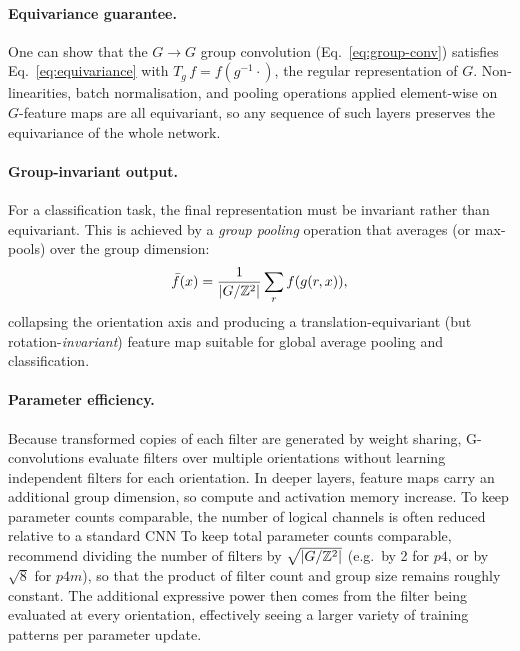 \paragraph{Equivariance guarantee.}
One can show \citep{cohen2016group} that the \(G \to G\) group convolution
(Eq.~\ref{eq:group-conv}) satisfies Eq.~\eqref{eq:equivariance} with
\(T_g\, f = f(g^{-1} \cdot)\), the regular representation of \(G\). Non-linearities, batch normalisation, and pooling
operations applied element-wise on \(G\)-feature maps are all equivariant, so any
sequence of such layers preserves the equivariance of the whole network.

\paragraph{Group-invariant output.}
For a classification task, the final representation must be invariant rather than
equivariant. This is achieved by a \emph{group pooling} operation that averages (or
max-pools) over the group dimension:
\begin{equation}
  \bar{f}(x) = \frac{1}{|G / \mathbb{Z}^2|} \sum_{r} f(g(r, x)),
  \label{eq:group-pool}
\end{equation}
collapsing the orientation axis and producing a translation-equivariant (but
rotation-\emph{invariant}) feature map suitable for global average pooling and
classification.

\paragraph{Parameter efficiency.}
Because transformed copies of each filter are generated by weight sharing, G-convolutions 
evaluate filters over multiple orientations without learning independent filters for each 
orientation. In deeper layers, feature maps carry an additional group dimension, so compute 
and activation memory increase. To keep parameter counts comparable, the number of logical 
channels is often reduced relative to a standard CNN To keep total parameter counts
comparable, \citet{cohen2016group} recommend dividing the number of filters by
\(\sqrt{|G / \mathbb{Z}^2|}\) (e.g.\ by 2 for \(p4\), or by \(\sqrt{8}\) for \(p4m\)),
so that the product of filter count and group size remains roughly constant.
The additional expressive power then comes from the filter being evaluated at every
orientation, effectively seeing a larger variety of training patterns per parameter update.